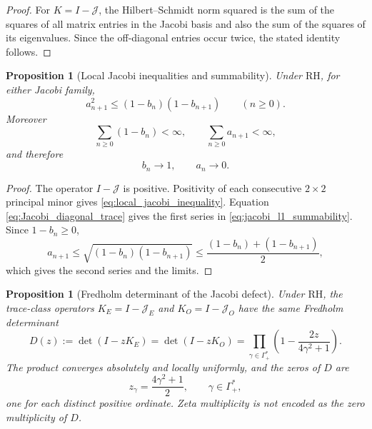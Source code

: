 \documentclass[preprint,12pt]{elsarticle}
\numberwithin{equation}{section}
\theoremstyle{plain}
\newtheorem{proposition}[theorem]{Proposition}
\theoremstyle{definition}
\theoremstyle{remark}
\newcommand{\RH}{\mathrm{RH}}
\begin{document}
\begin{proof}
For $K=I-\mathcal J$, the Hilbert--Schmidt norm squared is the sum of the squares of all matrix entries in the Jacobi basis and also the sum of the squares of its eigenvalues.  Since the off-diagonal entries occur twice, the stated identity follows.
\end{proof}

\begin{proposition}[Local Jacobi inequalities and summability]
\label{prop:local_jacobi_inequalities}
Under $\RH$, for either Jacobi family,
\begin{equation}
a_{n+1}^2\le(1-b_n)(1-b_{n+1})
\qquad(n\ge0).
\label{eq:local_jacobi_inequality}
\end{equation}
Moreover
\begin{equation}
\sum_{n\ge0}(1-b_n)<\infty,
\qquad
\sum_{n\ge0}a_{n+1}<\infty,
\label{eq:jacobi_l1_summability}
\end{equation}
and therefore
\begin{equation}
b_n\longrightarrow1,
\qquad
a_n\longrightarrow0.
\label{eq:jacobi_coeff_limits}
\end{equation}
\end{proposition}

\begin{proof}
The operator $I-\mathcal J$ is positive.  Positivity of each consecutive $2\times2$ principal minor gives \eqref{eq:local_jacobi_inequality}.  Equation \eqref{eq:Jacobi_diagonal_trace} gives the first series in \eqref{eq:jacobi_l1_summability}.  Since $1-b_n\ge0$,
\begin{equation}
a_{n+1}\le\sqrt{(1-b_n)(1-b_{n+1})}
\le\frac{(1-b_n)+(1-b_{n+1})}{2},
\label{eq:an_amgm_bound}
\end{equation}
which gives the second series and the limits.
\end{proof}

\begin{proposition}[Fredholm determinant of the Jacobi defect]
\label{prop:Fredholm_determinant}
Under $\RH$, the trace-class operators $K_E=I-\mathcal J_E$ and $K_O=I-\mathcal J_O$ have the same Fredholm determinant
\begin{equation}
D(z):=\det(I-zK_E)=\det(I-zK_O)
=\prod_{\gamma\in\Gamma_+^*}
\left(1-\frac{2z}{4\gamma^2+1}\right).
\label{eq:Fredholm_product}
\end{equation}
The product converges absolutely and locally uniformly, and the zeros of $D$ are
\begin{equation}
z_\gamma=\frac{4\gamma^2+1}{2},
\qquad \gamma\in\Gamma_+^*,
\label{eq:Fredholm_zeros}
\end{equation}
one for each distinct positive ordinate.  Zeta multiplicity is not encoded as the zero multiplicity of $D$.
\end{proposition}
\end{document}
